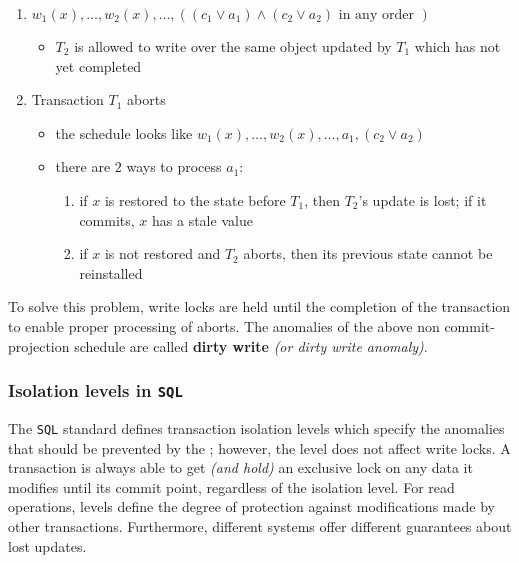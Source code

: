 \documentclass[english]{article}
\begin{document}
\begin{enumerate}
  \item \(w_1(x), \ldots, w_2(x), \ldots, \left( \left( c_1 \lor a_1 \right) \land \left( c_2 \lor a_2 \right) \text{ in any order }\right)\)
        \begin{itemize}[label=\(\rightarrow\)]
          \item \(T_2\) is allowed to write over the same object updated by \(T_1\) which has not yet completed
        \end{itemize}
  \item Transaction \(T_1\) aborts
        \begin{itemize}
          \item the schedule looks like \(w_1(x), \ldots, w_2(x), \ldots, a_1, \left( c_2 \lor a_2 \right)\)
          \item there are \(2\) ways to process \(a_1\):
                \begin{enumerate}[label=\arabic*.]
                  \item if \(x\) is restored to the state before \(T_1\), then \(T_2\)'s update is lost; if it commits, \(x\) has a stale value
                  \item if \(x\) is not restored and \(T_2\) aborts, then its previous state cannot be reinstalled
                \end{enumerate}
        \end{itemize}
\end{enumerate}

To solve this problem, write locks are held until the completion of the transaction to enable proper processing of aborts.
The anomalies of the above non commit-projection schedule are called \textbf{dirty write} \textit{(or dirty write anomaly)}.

\subsubsection{Isolation levels in \texttt{SQL}}

The \texttt{SQL} standard defines transaction isolation levels which specify the anomalies that should be prevented by the \dbms;
however, the level does not affect write locks.
A transaction is always able to get \textit{(and hold)} an exclusive lock on any data it modifies until its commit point, regardless of the isolation level.
For read operations, levels define the degree of protection against modifications made by other transactions.
Furthermore, different systems offer different guarantees about lost updates.
\end{document}
